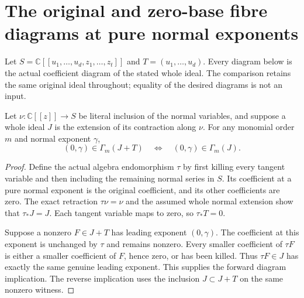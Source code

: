 \section{The original and zero-base fibre diagrams at pure normal exponents}

Let $S=\mathbb C[[u_1,\ldots,u_d,z_1,\ldots,z_t]]$ and
$T=(u_1,\ldots,u_d)$. Every diagram below is the actual coefficient
diagram of the stated whole ideal. The comparison retains the same
original ideal throughout; equality of the desired diagrams is not an
input.

\begin{theorem}
\label{hir:actual-normal-fibre-diagram-normal-projection}
\leanok
Let $\nu:\mathbb C[[z]]\to S$ be literal inclusion of the normal
variables, and suppose a whole ideal $J$ is the extension of its
contraction along $\nu$. For any monomial order $m$ and normal exponent
$\gamma$,
\[
 (0,\gamma)\in\Gamma_m(J+T)
 \quad\Longleftrightarrow\quad
 (0,\gamma)\in\Gamma_m(J).
\]
\end{theorem}
\begin{proof}
Define the actual algebra endomorphism $\tau$ by first killing every
tangent variable and then including the remaining normal series in
$S$. Its coefficient at a pure normal exponent is the original
coefficient, and its other coefficients are zero. The exact retraction
$\tau\nu=\nu$ and the assumed whole normal extension show that
$\tau_*J=J$. Each tangent variable maps to zero, so $\tau_*T=0$.

Suppose a nonzero $F\in J+T$ has leading exponent $(0,\gamma)$.
The coefficient at this exponent is unchanged by $\tau$ and remains
nonzero. Every smaller coefficient of $\tau F$ is either a smaller
coefficient of $F$, hence zero, or has been killed. Thus $\tau F\in J$
has exactly the same genuine leading exponent. This supplies the forward
diagram implication. The reverse implication uses the inclusion
$J\subset J+T$ on the same nonzero witness.
\end{proof}

